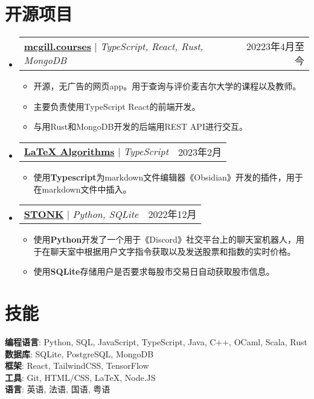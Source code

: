 \documentclass[letterpaper,11pt]{article}
\makeatletter
\newcommand{\resumeItem}[1]{
  \item\small{
    {#1 \vspace{-2pt}}
  }
}
\newcommand{\resumeProjectHeading}[2]{
  \item
  \begin{tabular*}{0.97\textwidth}{l@{\extracolsep{\fill}}r}
    \small#1 & #2 \\
  \end{tabular*}\vspace{-7pt}
}
\newcommand{\resumeSubHeadingListStart}{\begin{itemize}[leftmargin=0.15in, label={}]}
\newcommand{\resumeSubHeadingListEnd}{\end{itemize}}
\newcommand{\resumeItemListStart}{\begin{itemize}}
\newcommand{\resumeItemListEnd}{\end{itemize}\vspace{-5pt}}
\makeatother
\begin{document}
\begin{CJK*}{UTF8}{gbsn}
  \section{开源项目}
  \resumeSubHeadingListStart
  \resumeProjectHeading
  {\href{https://github.com/SamZhang02/DrooVE}{\textbf{mcgill.courses}} $|$ \emph{TypeScript, React, Rust, MongoDB}}{20223年4月至今}
  \resumeItemListStart
  \resumeItem{开源，无广告的网页app。用于查询与评价麦吉尔大学的课程以及教师。}
  \resumeItem{主要负责使用TypeScript React的前端开发。}
  \resumeItem{与用Rust和MongoDB开发的后端用REST API进行交互。}
  \resumeItemListEnd
  \resumeProjectHeading
  {\href{https://github.com/SamZhang02/obsidian-latex-algorithms}{\textbf{LaTeX Algorithms}} $|$ \emph{TypeScript}}{2023年2月}
  \resumeItemListStart
  \resumeItem{使用\textbf{Typescript}为markdown文件编辑器《Obsidian》开发的插件，用于在markdown文件中插入\LaTeX格式的数学证明与算法。}
  \resumeItemListEnd
  \resumeProjectHeading
  {\href{https://github.com/SamZhang02/STONK}{\textbf{STONK}} $|$ \emph{Python, SQLite}}{2022年12月}
  \resumeItemListStart
  \resumeItem{使用\textbf{Python}开发了一个用于《Discord》社交平台上的聊天室机器人，用于在聊天室中根据用户文字指令获取以及发送股票和指数的实时价格。}
  \resumeItem{使用\textbf{SQLite}存储用户是否要求每股市交易日自动获取股市信息。}
  \resumeItemListEnd
  \resumeSubHeadingListEnd

  \section{技能}
  \begin{itemize}[leftmargin=0.15in, label={}]
    \small{\item{
                  \textbf{编程语言}{: Python, SQL, JavaScript, TypeScript, Java, C++, OCaml, Scala, Rust} \\
                  \textbf{数据库}{: SQLite, PostgreSQL, MongoDB}\\
                  \textbf{框架}{: React, TailwindCSS, TensorFlow}\\
                  \textbf{工具}{: Git, HTML/CSS, \LaTeX, Node.JS}\\
                  \textbf{语言}{: 英语, 法语, 国语, 粤语}\\
            }}
  \end{itemize}


\end{CJK*}
\end{document}
